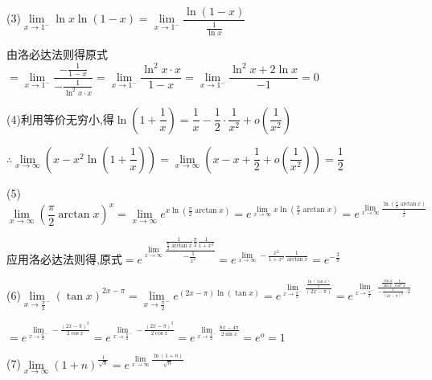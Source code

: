 (3)$\mathop {\lim }\limits_{x \to {1^ - }} \ln x\ln (1 - x) = \mathop {\lim }\limits_{x \to {1^ - }} \dfrac{{\ln (1 - x)}}{{\frac{1}{{\ln x}}}}$

由洛必达法则得原式$ = \mathop {\lim }\limits_{x \to {1^ - }} \dfrac{{ - \frac{1}{{1 - x}}}}{{ - \frac{1}{{{{\ln }^2}x \cdot x}}}} = \mathop {\lim }\limits_{x \to {1^ - }} \dfrac{{{{\ln }^2}x\cdot x}}{{1 - x}} = \mathop {\lim }\limits_{x \to {1^ - }} \dfrac{{{{\ln }^2}x + 2\ln x}}{{ - 1}} = 0$

(4)利用等价无穷小,得$\ln (1 + \dfrac{1}{x}) = \dfrac{1}{x} - \dfrac{1}{2} \cdot \dfrac{1}{{{x^2}}} + o(\dfrac{1}{{{x^2}}})$

$\therefore \mathop {\lim }\limits_{x \to \infty } \left( {x - {x^2}\ln (1 + \dfrac{1}{x})} \right) = \mathop {\lim }\limits_{x \to \infty } \left( {x - x + \dfrac{1}{2} + o(\dfrac{1}{{{x^2}}})} \right) = \dfrac{1}{2}$

(5)$\mathop {\lim }\limits_{x \to \infty } {(\dfrac{\pi }{2}\arctan x)^x} = \mathop {\lim }\limits_{x \to \infty } {e^{x\ln (\frac{\pi }{2}\arctan x)}} = {e^{\mathop {\lim }\limits_{x \to \infty } x\ln (\frac{\pi }{2}\arctan x)}} = {e^{\mathop {\lim }\limits_{x \to \infty } \frac{{\ln (\frac{\pi }{2}\arctan x)}}{{\frac{1}{x}}}}}$

应用洛必达法则得,原式$ = {e^{\mathop {\lim }\limits_{x \to \infty } \dfrac{{\frac{1}{{\frac{\pi }{2}\arctan x}}\frac{\pi }{2}\frac{1}{{1 + {x^2}}}}}{{ - \frac{1}{{{x^2}}}}}}} = {e^{\mathop {\lim }\limits_{x \to \infty }  - \frac{{{x^2}}}{{1 + {x^2}}}\frac{1}{{\arctan x}}}} = {e^{ - \frac{2}{\pi }}}$

(6)$\mathop {\lim }\limits_{x \to {{\frac{\pi }{2}}^ - }} {(\tan x)^{2x - \pi }} = \mathop {\lim }\limits_{x \to {{\frac{\pi }{2}}^ - }} {e^{(2x - \pi )\ln (\tan x)}} = {e^{\mathop {\lim }\limits_{x \to {{\frac{\pi }{2}}^ - }} \frac{{\frac{{\ln (\tan x)}}{1}}}{{(2x - \pi )}}}} = {e^{\mathop {\lim }\limits_{x \to {{\frac{\pi }{2}}^ - }} \frac{{\frac{{\cos x}}{{\sin x}}\frac{1}{{{{\cos }^2}x}}}}{{ - \frac{1}{{{{(2x - \pi )}^2}}}\cdot 2}}}}$

$ = {e^{\mathop {\lim }\limits_{x \to {{\frac{\pi }{2}}^ - }}  - \frac{{{{(2x - \pi )}^2}}}{{2\cos x}}}} = {e^{\mathop {\lim }\limits_{x \to {{\frac{\pi }{2}}^ - }}  - \frac{{{{(2x - \pi )}^2}}}{{2\cos x}}}} = {e^{\mathop {\lim }\limits_{x \to {{\frac{\pi }{2}}^ - }} \frac{{8x - 4\pi }}{{2\sin x}}}} = {e^o} = 1$

(7)$\mathop {\lim }\limits_{x \to \infty } {\left( {1 + n} \right)^{\frac{1}{{\sqrt n }}}} = {e^{\mathop {\lim }\limits_{x \to \infty } \frac{{\ln \left( {1 + n} \right)}}{{\sqrt n }}}}$


